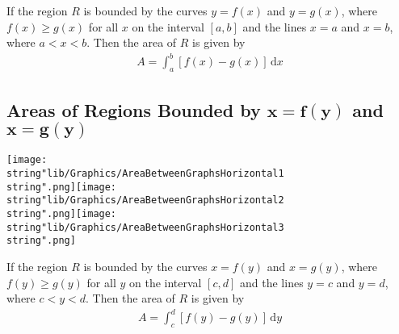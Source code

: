\documentclass[11pt,a4paper]{book}
\begin{document}
\medskip

\begin{tcolorbox}[colback=blue!5, colframe=black, boxrule=.4pt, sharpish corners]
If the region $R$ is bounded by the curves $y=f(x)$ and $y=g(x)$, where $f(x)\geq g(x)$ for all $x$ on the interval $[a,b]$ and the lines $x=a$ and $x=b$, where $a<x<b$. Then the area of $R$ is given by \begin{align*}{A={\displaystyle \int_{a}^{b}[f(x)-g(x)]\,\mathrm{d}x}}
\end{align*}
\end{tcolorbox}

\subsection{Areas of Regions Bounded by $\boldsymbol{x=f\left(y\right)}$ and
$\boldsymbol{x=g\left(y\right)}$}

\texttt{[image: \\string"lib/Graphics/AreaBetweenGraphsHorizontal1\\string".png]}\hspace{1cm}\texttt{[image: \\string"lib/Graphics/AreaBetweenGraphsHorizontal2\\string".png]}\hspace{1cm}\texttt{[image: \\string"lib/Graphics/AreaBetweenGraphsHorizontal3\\string".png]}

\medskip

\begin{tcolorbox}[colback=blue!5, colframe=black, boxrule=.4pt, sharpish corners]
If the region $R$ is bounded by the curves $x=f(y)$ and $x=g(y)$, where $f(y)\geq g(y)$ for all $y$ on the interval $[c,d]$ and the lines $y=c$ and $y=d$, where $c<y<d$. Then the area of $R$ is given by \begin{align*}{A={\displaystyle \int_{c}^{d}\left[f(y)-g(y)\right]\,\mathrm{d}y}}\end{align*}
\end{tcolorbox}
\end{document}
